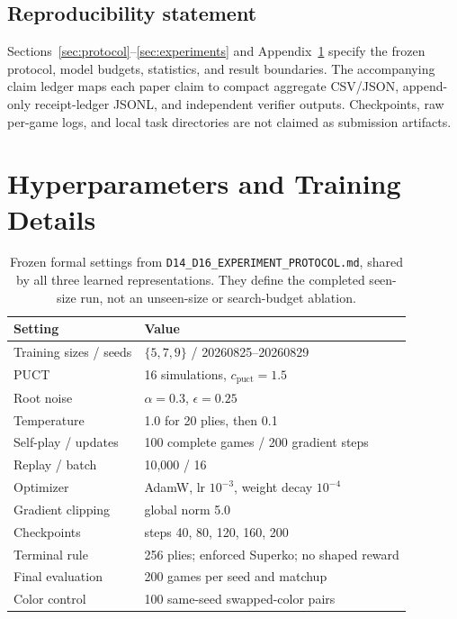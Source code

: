 \documentclass{article}
\begin{document}
\subsection*{Reproducibility statement}
Sections~\ref{sec:protocol}--\ref{sec:experiments} and
Appendix~\ref{app:hyperparameters} specify the frozen protocol, model budgets,
statistics, and result boundaries. The accompanying claim ledger maps each
paper claim to compact aggregate CSV/JSON, append-only receipt-ledger JSONL,
and independent verifier outputs. Checkpoints, raw per-game logs, and local
task directories are not claimed as submission artifacts.




\appendix

\section{Hyperparameters and Training Details}
\label{app:hyperparameters}

\begin{table}[H]
  \centering
  \small
  \caption{Frozen formal settings from
  \texttt{D14\_D16\_EXPERIMENT\_PROTOCOL.md}, shared by all three learned
  representations. They define the completed seen-size run, not an unseen-size
  or search-budget ablation.}
  \label{tab:hyperparameters}
  \begin{tabular}{ll}
    \toprule
    Setting & Value \\
    \midrule
    Training sizes / seeds & $\{5,7,9\}$ / 20260825--20260829 \\
    PUCT & 16 simulations, $c_{\mathrm{puct}}=1.5$ \\
    Root noise & $\alpha=0.3$, $\epsilon=0.25$ \\
    Temperature & 1.0 for 20 plies, then 0.1 \\
    Self-play / updates & 100 complete games / 200 gradient steps \\
    Replay / batch & 10,000 / 16 \\
    Optimizer & AdamW, lr $10^{-3}$, weight decay $10^{-4}$ \\
    Gradient clipping & global norm 5.0 \\
    Checkpoints & steps 40, 80, 120, 160, 200 \\
    Terminal rule & 256 plies; enforced Superko; no shaped reward \\
    Final evaluation & 200 games per seed and matchup \\
    Color control & 100 same-seed swapped-color pairs \\
    \bottomrule
  \end{tabular}
\end{table}
\end{document}
